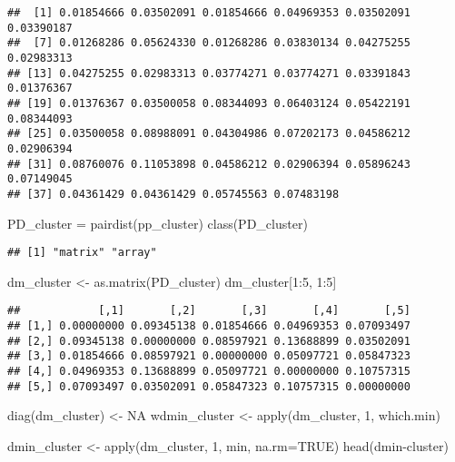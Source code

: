 \documentclass[
]{book}
\newenvironment{Shaded}{\begin{snugshade}}{\end{snugshade}}
\newcommand{\AttributeTok}[1]{\textcolor[rgb]{0.77,0.63,0.00}{#1}}
\newcommand{\ConstantTok}[1]{\textcolor[rgb]{0.00,0.00,0.00}{#1}}
\newcommand{\DecValTok}[1]{\textcolor[rgb]{0.00,0.00,0.81}{#1}}
\newcommand{\FunctionTok}[1]{\textcolor[rgb]{0.00,0.00,0.00}{#1}}
\newcommand{\NormalTok}[1]{#1}
\newcommand{\OtherTok}[1]{\textcolor[rgb]{0.56,0.35,0.01}{#1}}
\newcommand{\SpecialCharTok}[1]{\textcolor[rgb]{0.00,0.00,0.00}{#1}}
\begin{document}
\begin{verbatim}
##  [1] 0.01854666 0.03502091 0.01854666 0.04969353 0.03502091 0.03390187
##  [7] 0.01268286 0.05624330 0.01268286 0.03830134 0.04275255 0.02983313
## [13] 0.04275255 0.02983313 0.03774271 0.03774271 0.03391843 0.01376367
## [19] 0.01376367 0.03500058 0.08344093 0.06403124 0.05422191 0.08344093
## [25] 0.03500058 0.08988091 0.04304986 0.07202173 0.04586212 0.02906394
## [31] 0.08760076 0.11053898 0.04586212 0.02906394 0.05896243 0.07149045
## [37] 0.04361429 0.04361429 0.05745563 0.07483198
\end{verbatim}

\begin{Shaded}
\begin{Highlighting}[]
\NormalTok{PD\_cluster }\OtherTok{=} \FunctionTok{pairdist}\NormalTok{(pp\_cluster)}
\FunctionTok{class}\NormalTok{(PD\_cluster)}
\end{Highlighting}
\end{Shaded}

\begin{verbatim}
## [1] "matrix" "array"
\end{verbatim}

\begin{Shaded}
\begin{Highlighting}[]
\NormalTok{dm\_cluster }\OtherTok{\textless{}{-}} \FunctionTok{as.matrix}\NormalTok{(PD\_cluster)}
\NormalTok{dm\_cluster[}\DecValTok{1}\SpecialCharTok{:}\DecValTok{5}\NormalTok{, }\DecValTok{1}\SpecialCharTok{:}\DecValTok{5}\NormalTok{]}
\end{Highlighting}
\end{Shaded}

\begin{verbatim}
##            [,1]       [,2]       [,3]       [,4]       [,5]
## [1,] 0.00000000 0.09345138 0.01854666 0.04969353 0.07093497
## [2,] 0.09345138 0.00000000 0.08597921 0.13688899 0.03502091
## [3,] 0.01854666 0.08597921 0.00000000 0.05097721 0.05847323
## [4,] 0.04969353 0.13688899 0.05097721 0.00000000 0.10757315
## [5,] 0.07093497 0.03502091 0.05847323 0.10757315 0.00000000
\end{verbatim}

\begin{Shaded}
\begin{Highlighting}[]
\FunctionTok{diag}\NormalTok{(dm\_cluster) }\OtherTok{\textless{}{-}} \ConstantTok{NA}
\NormalTok{wdmin\_cluster }\OtherTok{\textless{}{-}} \FunctionTok{apply}\NormalTok{(dm\_cluster, }\DecValTok{1}\NormalTok{, which.min)}

\NormalTok{dmin\_cluster }\OtherTok{\textless{}{-}} \FunctionTok{apply}\NormalTok{(dm\_cluster, }\DecValTok{1}\NormalTok{, min, }\AttributeTok{na.rm=}\ConstantTok{TRUE}\NormalTok{)}
\FunctionTok{head}\NormalTok{(dmin}\SpecialCharTok{{-}}\NormalTok{cluster)}
\end{Highlighting}
\end{Shaded}
\end{document}
